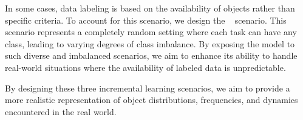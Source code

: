 In some cases, data labeling is based on the availability of objects rather than specific criteria. To account for this scenario, we design the \rsplit~ scenario. This scenario represents a completely random setting where each task can have any class, leading to varying degrees of class imbalance. By exposing the model to such diverse and imbalanced scenarios, we aim to enhance its ability to handle real-world situations where the availability of labeled data is unpredictable.

By designing these three incremental learning scenarios, we aim to provide a more realistic representation of object distributions, frequencies, and dynamics encountered in the real world.


